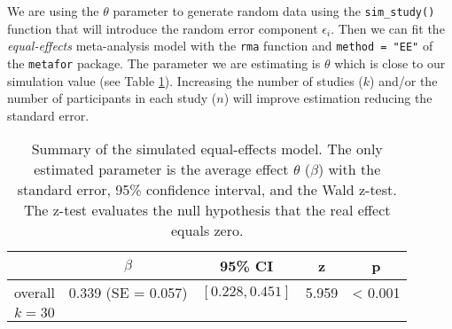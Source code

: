 \documentclass[
  man,floatsintext]{apa6}
\newenvironment{Shaded}{\begin{snugshade}}{\end{snugshade}}
\newcommand{\AttributeTok}[1]{\textcolor[rgb]{0.13,0.29,0.53}{#1}}
\newcommand{\CommentTok}[1]{\textcolor[rgb]{0.56,0.35,0.01}{\textit{#1}}}
\newcommand{\DecValTok}[1]{\textcolor[rgb]{0.00,0.00,0.81}{#1}}
\newcommand{\FloatTok}[1]{\textcolor[rgb]{0.00,0.00,0.81}{#1}}
\newcommand{\FunctionTok}[1]{\textcolor[rgb]{0.13,0.29,0.53}{\textbf{#1}}}
\newcommand{\NormalTok}[1]{#1}
\newcommand{\OtherTok}[1]{\textcolor[rgb]{0.56,0.35,0.01}{#1}}
\newcommand{\SpecialCharTok}[1]{\textcolor[rgb]{0.81,0.36,0.00}{\textbf{#1}}}
\newcommand{\StringTok}[1]{\textcolor[rgb]{0.31,0.60,0.02}{#1}}
\begin{document}
\begin{Shaded}
\end{Shaded}

\normalsize

We are using the \(\theta\) parameter to generate random data using the \texttt{sim\_study()} function that will introduce the random error component \(\epsilon_{i}\). Then we can fit the \emph{equal-effects} meta-analysis model with the \texttt{rma} function and \texttt{method\ =\ "EE"} of the \texttt{metafor} package. The parameter we are estimating is \(\theta\) which is close to our simulation value (see Table \ref{tab:res-equal-effects}). Increasing the number of studies (\(k\)) and/or the number of participants in each study (\(n\)) will improve estimation reducing the standard error.

\scriptsize

\begin{table}[H]

\caption{\label{tab:res-equal-effects}Summary of the simulated equal-effects model. The only estimated parameter is the average effect \(\theta\) (\(\beta\)) with the standard error, 95\% confidence interval, and the Wald z-test. The z-test evaluates the null hypothesis that the real effect equals zero.}
\centering
\fontsize{9}{11}\selectfont
\begin{tabular}[t]{ccccc}
\toprule
 & $\beta$ & 95\% CI & z & p\\
\midrule
overall & 0.339 (SE = 0.057) & $[0.228, 0.451]$ & 5.959 & < 0.001\\
\bottomrule
\multicolumn{5}{l}{\textsuperscript{} $k = 30$}\\
\end{tabular}
\end{table}
\end{document}
